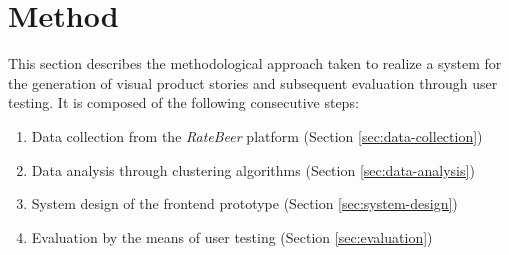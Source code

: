 \section{Method} \label{sec:method}
This section describes the methodological approach taken to realize a system for the generation of visual product stories and subsequent evaluation through user testing.
It is composed of the following consecutive steps:
\begin{enumerate}
	\item Data collection from the \textit{RateBeer} platform (Section \ref{sec:data-collection})
	\item Data analysis through clustering algorithms (Section \ref{sec:data-analysis})
	\item System design of the frontend prototype (Section \ref{sec:system-design})
	\item Evaluation by the means of user testing (Section \ref{sec:evaluation})
\end{enumerate}




